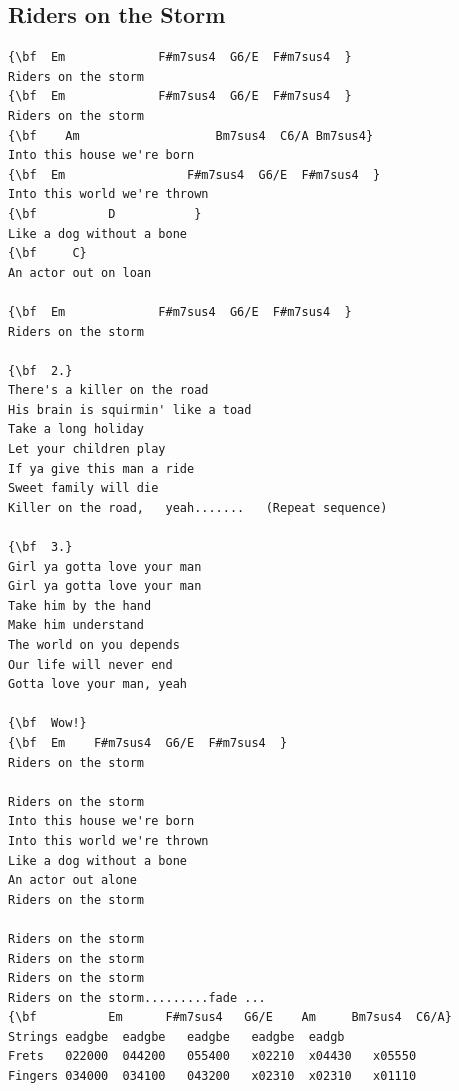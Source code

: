 \documentclass[a4paper]{article}
\begin{document}
\subsection{Riders on the Storm}
\begin{Verbatim}[commandchars=\\\{\}]
{\bf  Em             F#m7sus4  G6/E  F#m7sus4  }
Riders on the storm
{\bf  Em             F#m7sus4  G6/E  F#m7sus4  }
Riders on the storm
{\bf    Am                   Bm7sus4  C6/A Bm7sus4}
Into this house we're born
{\bf  Em                 F#m7sus4  G6/E  F#m7sus4  }
Into this world we're thrown
{\bf          D           }
Like a dog without a bone
{\bf     C}
An actor out on loan

{\bf  Em             F#m7sus4  G6/E  F#m7sus4  }
Riders on the storm

{\bf  2.}
There's a killer on the road
His brain is squirmin' like a toad
Take a long holiday
Let your children play
If ya give this man a ride
Sweet family will die
Killer on the road,   yeah.......   (Repeat sequence)

{\bf  3.}
Girl ya gotta love your man
Girl ya gotta love your man
Take him by the hand
Make him understand
The world on you depends
Our life will never end
Gotta love your man, yeah

{\bf  Wow!}
{\bf  Em    F#m7sus4  G6/E  F#m7sus4  }
Riders on the storm

Riders on the storm
Into this house we're born
Into this world we're thrown
Like a dog without a bone
An actor out alone
Riders on the storm

Riders on the storm
Riders on the storm
Riders on the storm
Riders on the storm.........fade ...
{\bf          Em      F#m7sus4   G6/E    Am     Bm7sus4  C6/A}
Strings eadgbe  eadgbe   eadgbe   eadgbe  eadgb                             
Frets   022000  044200   055400   x02210  x04430   x05550
Fingers 034000  034100   043200   x02310  x02310   x01110

\end{Verbatim}
\newpage
\end{document}
